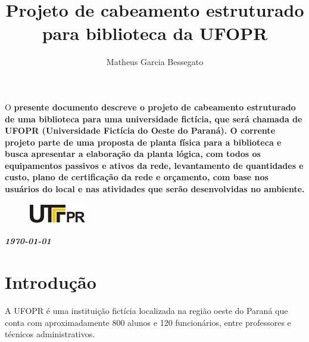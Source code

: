 \documentclass[	DIV=calc,%
							paper=a4,%
							fontsize=12pt,%
							onecolumn]{scrartcl}	 					%
\title{Projeto de cabeamento estruturado para biblioteca da UFOPR}					%
\author{Matheus Garcia Bessegato}  	%
\date{}																				%
\newcommand{\initial}[1]{%
     \lettrine[lines=3,lhang=0.3,nindent=0em]{
     				\color{DarkGoldenrod}
     				{\textsf{#1}}}{}}
\begin{document}
\maketitle
\thispagestyle{fancy} 	
\thispagestyle{empty}		%




\initial{O}\textbf{ presente documento descreve o projeto de cabeamento estruturado de uma biblioteca para uma universidade fictícia, que será chamada de UFOPR (Universidade Fictícia do Oeste do Paraná). O corrente projeto parte de uma proposta de planta física para a biblioteca e busca apresentar a elaboração da planta lógica, com todos os equipamentos passivos e ativos da rede, levantamento de quantidades e custo, plano de certificação da rede e orçamento, com base nos usuários do local e nas atividades que serão desenvolvidas no ambiente.}

\begin{figure}
	\centering
	\includegraphics{utfpr}
\end{figure}

\vspace{3cm}
\centerline{\textit{\textbf{\today}}}

\clearpage
    \renewcommand*\listfigurename{Lista de figuras}
\listoffigures

\renewcommand*\listtablename{Lista de tabelas}
\listoftables

\clearpage
\renewcommand{\contentsname}{Sumário}
\tableofcontents
\clearpage

\section{Introdução}
A UFOPR é uma instituição fictícia localizada na região oeste do Paraná que conta com aproximadamente 800 alunos e 120 funcionários, entre professores e técnicos administrativos.
\end{document}

